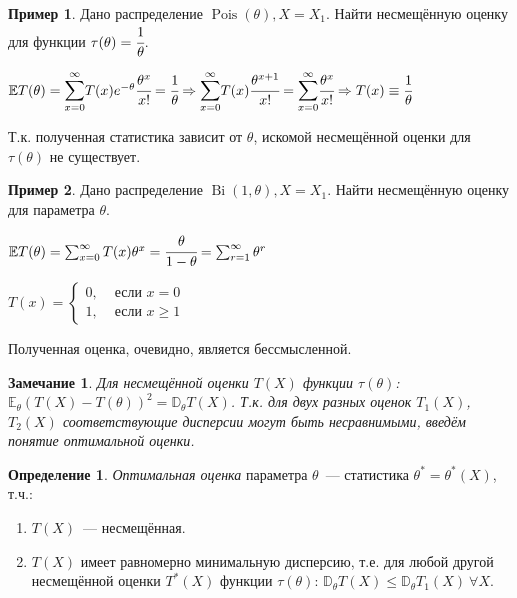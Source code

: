 \documentclass[oneside,final,14pt]{extreport}
\newtheorem*{rmrk}{Замечание}
\theoremstyle{definition}
\newtheorem{defn}{Определение}[section]
\newtheorem*{exmp}{Пример}
\begin{document}
\begin{exmp}
Дано распределение \( \operatorname{Pois}(\theta), X = X_{1}. \) Найти несмещённую оценку для функции \( \tau(\theta) = \cfrac{1}{\theta} \).

\( \mathbb{E}T(\theta) = \mathlarger{\mathlarger{\sum}}_{x=0}^{\infty}T(x)e^{-\theta}\cfrac{\theta^{x}}{x!} = \cfrac{1}{\theta} \Rightarrow \mathlarger{\mathlarger{\sum}}_{x=0}^{\infty}T(x)\cfrac{\theta^{x+1}}{x!} = \mathlarger{\mathlarger{\sum}}_{x=0}^{\infty}\cfrac{\theta^{x}}{x!} \Rightarrow T(x) \equiv \cfrac{1}{\theta} \)

Т.к. полученная статистика зависит от \( \theta \), искомой несмещённой оценки для \( \tau(\theta) \) не существует.
\end{exmp}

\begin{exmp}
Дано распределение \( \operatorname{Bi}(1, \theta), X = X_1 \). Найти несмещённую оценку для параметра \( \theta \).

\( \mathbb{E}T(\theta) = \sum_{x=0}^{\infty}T(x)\theta^{x} = \cfrac{\theta}{1-\theta} = \sum_{r=1}^{\infty}\theta^{r}\)

\( T(x)=\left\{\begin{array}{ll}
0, & \text { если } x = 0 \\
1, & \text { если } x \geq 1
\end{array}\right.
\)

Полученная оценка, очевидно, является бессмысленной.
\end{exmp}

\begin{rmrk}
Для несмещённой оценки \( T(X) \) функции \( \tau(\theta) \): \(\mathbb{E}_{\theta}(T(X)-T(\theta))^{2}=\mathbb{D}_{\theta} T(X)\). Т.к. для двух разных оценок \( T_1(X) \), \( T_2(X) \) соответствующие дисперсии могут быть несравнимыми, введём понятие оптимальной оценки.
\end{rmrk}

\begin{defn}
{\it Оптимальная оценка} параметра \( \theta \)~--- статистика \( \theta^{*}=\theta^{*}(X) \), т.ч.:
\begin{enumerate}
    \item \( T(X) \)~--- несмещённая.
    \item \( T(X) \) имеет равномерно минимальную дисперсию, т.е. для любой другой несмещённой оценки \( T^{*}(X) \) функции \( \tau(\theta) \): \( \mathbb{D}_{\theta} T(X) \leq \mathbb{D}_{\theta} T_{1}(X)~ \forall X\).
\end{enumerate}
\end{defn}
\end{document}

